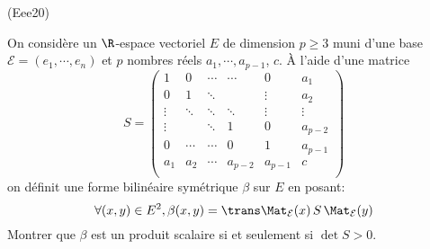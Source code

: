 \begin{tiny}(Eee20)\end{tiny} On considère un $\R$-espace vectoriel $E$ de dimension $p\geq 3$ muni d'une base $\mathcal{E}=(e_1,\cdots,e_n)$ et $p$ nombres réels $a_1, \cdots ,a_{p-1}$, $c$. À l'aide d'une matrice 
\begin{displaymath}
 S=
\begin{pmatrix}
 1     & 0      & \cdots & \cdots  & 0       & a_1    \\
0      & 1      & \ddots &         & \vdots  & a_2    \\
\vdots & \ddots & \ddots & \ddots  & \vdots  & \vdots \\
\vdots &        & \ddots & 1       & 0       & a_{p-2} \\
0      & \cdots & \cdots & 0       & 1       & a_{p-1} \\
a_1    & a_2    & \cdots & a_{p-2} & a_{p-1} & c      \\
\end{pmatrix}
\end{displaymath}
on définit une forme bilinéaire symétrique $\beta$ sur $E$ en posant:
\begin{displaymath}
 \forall (x,y)\in E^2,
\beta(x,y) = 
\trans \Mat_{\mathcal{E}}(x) \, S \, \Mat_{\mathcal{E}}(y)
\end{displaymath}
 Montrer que $\beta$ est un produit scalaire si et seulement si $\det S >0$.